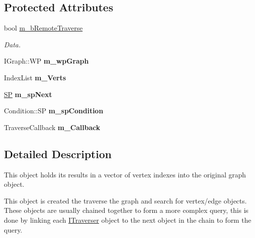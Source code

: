 \subsection*{Protected Attributes}
\begin{DoxyCompactItemize}
\item 
\mbox{\label{class_i_graph_1_1_i_traverser_add28950de19b35b00f711ed6d27a0a01}} 
bool \hyperlink{class_i_graph_1_1_i_traverser_add28950de19b35b00f711ed6d27a0a01}{m\+\_\+b\+Remote\+Traverse}
\begin{DoxyCompactList}\small\item\em Data. \end{DoxyCompactList}\item 
\mbox{\label{class_i_graph_1_1_i_traverser_a7358aee35de7715811008b6de2fa51b1}} 
I\+Graph\+::\+WP {\bfseries m\+\_\+wp\+Graph}
\item 
\mbox{\label{class_i_graph_1_1_i_traverser_a90c722fa3374b08177d42cc701bdac58}} 
Index\+List {\bfseries m\+\_\+\+Verts}
\item 
\mbox{\label{class_i_graph_1_1_i_traverser_a087e8109096af659f768a7a36df609f6}} 
\hyperlink{class_i_graph_1_1_i_traverser_a5a5ccc81423d6024742d1898a310d812}{SP} {\bfseries m\+\_\+sp\+Next}
\item 
\mbox{\label{class_i_graph_1_1_i_traverser_a81e2c4377d86f2f2ff1690947ae35f17}} 
Condition\+::\+SP {\bfseries m\+\_\+sp\+Condition}
\item 
\mbox{\label{class_i_graph_1_1_i_traverser_a1590fdbb91981aedf506d783fa2c8fb6}} 
Traverse\+Callback {\bfseries m\+\_\+\+Callback}
\end{DoxyCompactItemize}


\subsection{Detailed Description}
This object holds it\textquotesingle{}s results in a vector of vertex indexes into the original graph object. 

This object is created the traverse the graph and search for vertex/edge objects. These objects are usually chained together to form a more complex query, this is done by linking each \hyperlink{class_i_graph_1_1_i_traverser}{I\+Traverser} object to the next object in the chain to form the query. 

